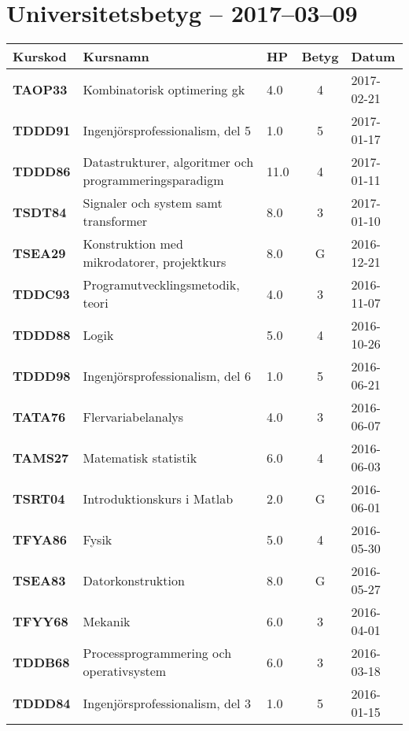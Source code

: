 \documentclass[a4paper,notitlepage]{article}
\begin{document}
\section*{Universitetsbetyg -- 2017--03--09}
\renewcommand*{\arraystretch}{1.4}
\begin{longtable}[h]{l l l c l}
    \textbf{Kurskod} & \textbf{Kursnamn} & \textbf{HP} & \textbf{Betyg} & \textbf{Datum}
    \\ \hline
    \textbf{TAOP33} & Kombinatorisk optimering gk	                       & 4.0&4	&2017-02-21 \\
    \textbf{TDDD91} & Ingenjörsprofessionalism, del 5	                   & 1.0&5	&2017-01-17 \\
    \textbf{TDDD86} & Datastrukturer, algoritmer och programmeringsparadigm & 11.0&4	&2017-01-11 \\
    \textbf{TSDT84} & Signaler och system samt transformer	               & 8.0&3	&2017-01-10 \\
    \textbf{TSEA29} & Konstruktion med mikrodatorer, projektkurs	           & 8.0&G	&2016-12-21 \\
    \textbf{TDDC93} & Programutvecklingsmetodik, teori	                   & 4.0&3	&2016-11-07 \\
    \textbf{TDDD88} & Logik	                                               & 5.0&4	&2016-10-26 \\
    \textbf{TDDD98} & Ingenjörsprofessionalism, del 6	                   & 1.0&5	&2016-06-21 \\
    \textbf{TATA76} & Flervariabelanalys	                                   & 4.0&3	&2016-06-07 \\
    \textbf{TAMS27} & Matematisk statistik	                               & 6.0&4	&2016-06-03 \\
    \textbf{TSRT04} & Introduktionskurs i Matlab	                           & 2.0&G	&2016-06-01 \\
    \textbf{TFYA86} & Fysik	                                               & 5.0&4	&2016-05-30 \\
    \textbf{TSEA83} & Datorkonstruktion	                                   & 8.0&G	&2016-05-27 \\
    \textbf{TFYY68} & Mekanik	                                           & 6.0&3	&2016-04-01 \\
    \textbf{TDDB68} & Processprogrammering och operativsystem	           & 6.0&3	&2016-03-18 \\
    \textbf{TDDD84} & Ingenjörsprofessionalism, del 3	                   & 1.0&5	&2016-01-15 \\

\end{longtable}
\end{document}
